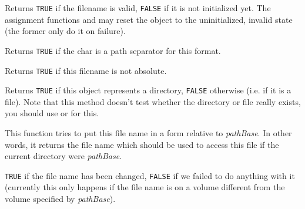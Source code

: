 \label{wxfilenameisok}


Returns {\tt TRUE} if the filename is valid, {\tt FALSE} if it is not
initialized yet. The assignment functions and
 may reset the object to the uninitialized,
invalid state (the former only do it on failure).

\label{wxfilenameispathseparator}


Returns {\tt TRUE} if the char is a path separator for this format.

\label{wxfilenameisrelative}


Returns {\tt TRUE} if this filename is not absolute.

\label{wxfilenameisdir}


Returns {\tt TRUE} if this object represents a directory, {\tt FALSE} otherwise
(i.e. if it is a file). Note that this method doesn't test whether the
directory or file really exists, you should use 
 or 
 for this.

\label{wxfilenamemakerelativeto}


This function tries to put this file name in a form relative to {\it pathBase}.
In other words, it returns the file name which should be used to access this
file if the current directory were {\it pathBase}.




{\tt TRUE} if the file name has been changed, {\tt FALSE} if we failed to do
anything with it (currently this only happens if the file name is on a volume
different from the volume specified by {\it pathBase}).

